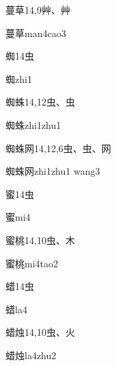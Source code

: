 \begin{Entry}{蔓草}{14,9}{⾋、⾋}
  \begin{Phonetics}{蔓草}{man4cao3}
  \end{Phonetics}
\end{Entry}

\begin{Entry}{蜘}{14}{⾍}
  \begin{Phonetics}{蜘}{zhi1}
  \end{Phonetics}
\end{Entry}

\begin{Entry}{蜘蛛}{14,12}{⾍、⾍}
  \begin{Phonetics}{蜘蛛}{zhi1zhu1}
  \end{Phonetics}
\end{Entry}

\begin{Entry}{蜘蛛网}{14,12,6}{⾍、⾍、⽹}
  \begin{Phonetics}{蜘蛛网}{zhi1zhu1 wang3}
  \end{Phonetics}
\end{Entry}

\begin{Entry}{蜜}{14}{⾍}
  \begin{Phonetics}{蜜}{mi4}
  \end{Phonetics}
\end{Entry}

\begin{Entry}{蜜桃}{14,10}{⾍、⽊}
  \begin{Phonetics}{蜜桃}{mi4tao2}
  \end{Phonetics}
\end{Entry}

\begin{Entry}{蜡}{14}{⾍}
  \begin{Phonetics}{蜡}{la4}
  \end{Phonetics}
\end{Entry}

\begin{Entry}{蜡烛}{14,10}{⾍、⽕}
  \begin{Phonetics}{蜡烛}{la4zhu2}
  \end{Phonetics}
\end{Entry}

